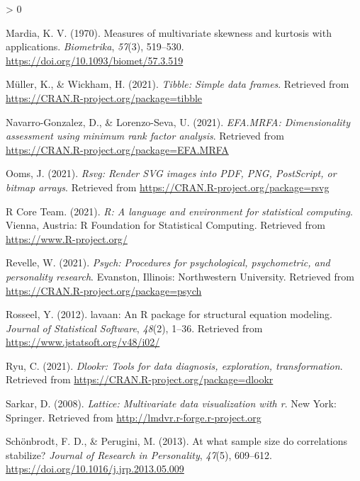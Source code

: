 \documentclass[
  english,
  man]{apa6}
\newlength{\cslhangindent}
\newenvironment{CSLReferences}[2] %
 {%
  \setlength{\parindent}{0pt}
  \ifodd #1 \everypar{\setlength{\hangindent}{\cslhangindent}}\ignorespaces\fi
  \ifnum #2 > 0
  \setlength{\parskip}{#2\baselineskip}
  \fi
 }%
 {}
\begin{document}
\begin{CSLReferences}{1}{0}
\leavevmode\hypertarget{ref-mardiaMeasuresMultivariateSkewness1970}{}%
Mardia, K. V. (1970). Measures of multivariate skewness and kurtosis with applications. \emph{Biometrika}, \emph{57}(3), 519--530. \url{https://doi.org/10.1093/biomet/57.3.519}

\leavevmode\hypertarget{ref-R-tibble}{}%
Müller, K., \& Wickham, H. (2021). \emph{Tibble: Simple data frames}. Retrieved from \url{https://CRAN.R-project.org/package=tibble}

\leavevmode\hypertarget{ref-R-EFA.MRFA}{}%
Navarro-Gonzalez, D., \& Lorenzo-Seva, U. (2021). \emph{EFA.MRFA: Dimensionality assessment using minimum rank factor analysis}. Retrieved from \url{https://CRAN.R-project.org/package=EFA.MRFA}

\leavevmode\hypertarget{ref-R-rsvg}{}%
Ooms, J. (2021). \emph{Rsvg: Render SVG images into PDF, PNG, PostScript, or bitmap arrays}. Retrieved from \url{https://CRAN.R-project.org/package=rsvg}

\leavevmode\hypertarget{ref-R-base}{}%
R Core Team. (2021). \emph{R: A language and environment for statistical computing}. Vienna, Austria: R Foundation for Statistical Computing. Retrieved from \url{https://www.R-project.org/}

\leavevmode\hypertarget{ref-R-psych}{}%
Revelle, W. (2021). \emph{Psych: Procedures for psychological, psychometric, and personality research}. Evanston, Illinois: Northwestern University. Retrieved from \url{https://CRAN.R-project.org/package=psych}

\leavevmode\hypertarget{ref-R-lavaan}{}%
Rosseel, Y. (2012). {lavaan}: An {R} package for structural equation modeling. \emph{Journal of Statistical Software}, \emph{48}(2), 1--36. Retrieved from \url{https://www.jstatsoft.org/v48/i02/}

\leavevmode\hypertarget{ref-R-dlookr}{}%
Ryu, C. (2021). \emph{Dlookr: Tools for data diagnosis, exploration, transformation}. Retrieved from \url{https://CRAN.R-project.org/package=dlookr}

\leavevmode\hypertarget{ref-R-lattice}{}%
Sarkar, D. (2008). \emph{Lattice: Multivariate data visualization with r}. New York: Springer. Retrieved from \url{http://lmdvr.r-forge.r-project.org}

\leavevmode\hypertarget{ref-schonbrodtWhatSampleSize2013}{}%
Schönbrodt, F. D., \& Perugini, M. (2013). At what sample size do correlations stabilize? \emph{Journal of Research in Personality}, \emph{47}(5), 609--612. \url{https://doi.org/10.1016/j.jrp.2013.05.009}


\end{CSLReferences}
\end{document}
